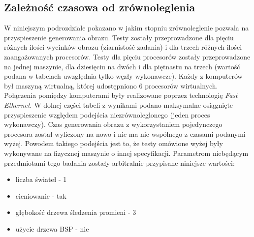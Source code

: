 \subsection{Zależność czasowa od zrównoleglenia}

W niniejszym podrozdziale pokazano w jakim stopniu zrównoleglenie pozwala na przyspieszenie generowania obrazu. Testy zostały przeprowadzone dla pięciu różnych ilości wycinków obrazu (ziarnistość zadania) i dla trzech różnych ilości zaangażowanych procesorów. Testy dla pięciu procesorów zostały przeprowadzone na jednej maszynie, dla dziesięciu na dwóch i dla piętnastu na trzech (wartość podana w tabelach uwzględnia tylko węzły wykonawcze). Każdy z komputerów był maszyną wirtualną, której udostępniono 6 procesorów wirtualnych. Połączenia pomiędzy komputerami były realizowane poprzez technologię \emph{Fast Ethernet}. W dolnej części tabeli z wynikami podano maksymalne osiągnięte przyspieszenie względem podejścia niezrównoleglonego (jeden proces wykonawczy). Czas generowania obrazu z wykorzystaniem pojedynczego procesora został wyliczony na nowo i nie ma nic wspólnego z czasami podanymi wyżej. Powodem takiego podejścia jest to, że testy omówione wyżej były wykonywane na fizycznej maszynie o innej specyfikacji. Parametrom niebędącym przedmiotami tego badania zostały arbitralnie przypisane niniejsze wartości:

\begin{itemize}

\item liczba świateł - 1
\item cieniowanie - tak
\item głębokość drzewa śledzenia promieni - 3
\item użycie drzewa BSP - nie

\end{itemize}

